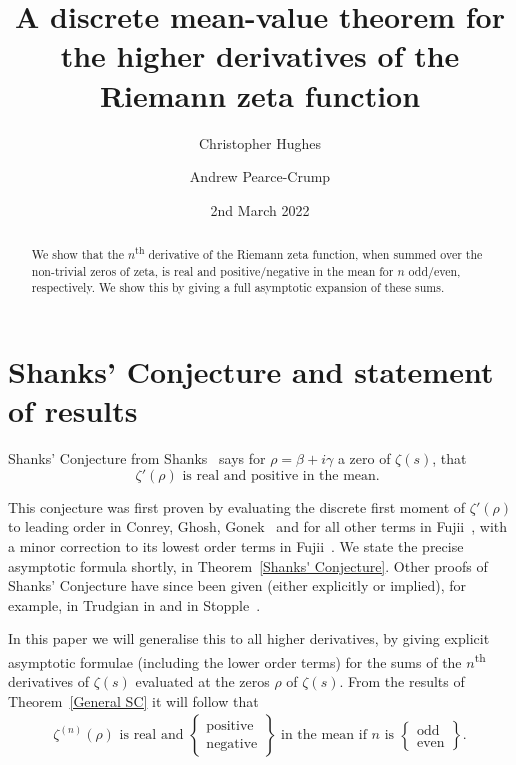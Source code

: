 \documentclass[12pt,a4paper,reqno]{amsart}
\theoremstyle{remark}
\numberwithin{equation}{section}
\begin{document}
\title[Mean-value of the $n$\textsuperscript{th} derivative of zeta]{A discrete mean-value theorem for the higher derivatives of the Riemann zeta function}

\author{Christopher Hughes}
\address{Department of Mathematics, University of York, York, YO10 5DD, United Kingdom}
\author{Andrew Pearce-Crump}
\address{Department of Mathematics, University of York, York, YO10 5DD, United Kingdom}

\date{2nd March 2022}


\begin{abstract}
We show that the $n$\textsuperscript{th} derivative of the Riemann zeta function, when summed over the non-trivial zeros of zeta, is real and positive/negative in the mean for $n$ odd/even, respectively. We show this by giving a full asymptotic expansion of these sums.
\end{abstract}

\maketitle




\section{Shanks' Conjecture and statement of results}

Shanks' Conjecture from Shanks~\cite{ShanksConj} says for $\rho = \beta + i \gamma$ a zero of $\zeta(s)$, that
\[
\zeta '(\rho) \text{ is real and positive in the mean. }
\]


This conjecture was first proven by evaluating the discrete first moment of $\zeta'(\rho)$ to leading order in Conrey, Ghosh, Gonek~\cite{CGG88} and for all other terms in Fujii~\cite{FujiiShanks}, with a minor correction to its lowest order terms in Fujii~\cite{FujiiDist}.  We state the precise asymptotic formula shortly, in Theorem~\ref{Shanks' Conjecture}. Other proofs of Shanks' Conjecture have since been given (either explicitly or implied), for example, in Trudgian in \cite{Trud} and in Stopple~\cite{Stopp}.


In this paper we will generalise this to all higher derivatives, by giving explicit asymptotic formulae (including the lower order terms) for the sums of the $n$\textsuperscript{th} derivatives of $\zeta (s)$ evaluated at the zeros $\rho$ of $\zeta (s)$. From the results of Theorem~\ref{General SC} it will follow that
\begin{align*}
\zeta^{(n)}(\rho) \text{ is real and }
    \left\{ \begin{aligned}
        \text{positive } \\
        \text{negative}
    \end{aligned}\right\} \text{ in the mean if $n$ is }
     \left\{ \begin{aligned}
        \text{odd } \\
        \text{even}
    \end{aligned}\right\}.
\end{align*}
\end{document}
